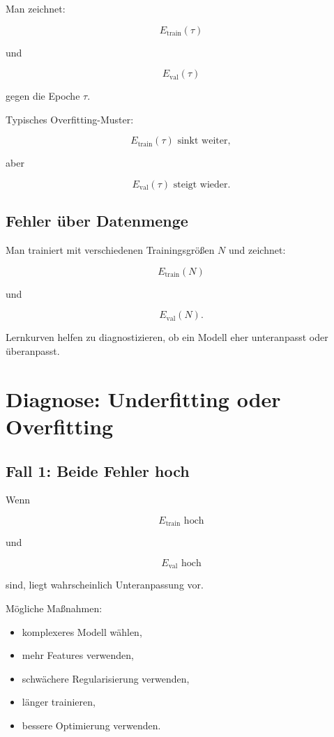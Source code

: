 Man zeichnet:

\[
    E_{\mathrm{train}}(\tau)
\]

und

\[
    E_{\mathrm{val}}(\tau)
\]

gegen die Epoche \(\tau\).

Typisches Overfitting-Muster:

\[
    E_{\mathrm{train}}(\tau)
    \text{ sinkt weiter},
\]

aber

\[
    E_{\mathrm{val}}(\tau)
    \text{ steigt wieder}.
\]

\subsection{Fehler über Datenmenge}

Man trainiert mit verschiedenen Trainingsgrößen \(N\) und zeichnet:

\[
    E_{\mathrm{train}}(N)
\]

und

\[
    E_{\mathrm{val}}(N).
\]

\begin{conceptbox}
Lernkurven helfen zu diagnostizieren, ob ein Modell eher unteranpasst oder überanpasst.
\end{conceptbox}

\section{Diagnose: Underfitting oder Overfitting}

\subsection{Fall 1: Beide Fehler hoch}

Wenn

\[
    E_{\mathrm{train}}
    \text{ hoch}
\]

und

\[
    E_{\mathrm{val}}
    \text{ hoch}
\]

sind, liegt wahrscheinlich Unteranpassung vor.

Mögliche Maßnahmen:

\begin{itemize}
    \item komplexeres Modell wählen,
    \item mehr Features verwenden,
    \item schwächere Regularisierung verwenden,
    \item länger trainieren,
    \item bessere Optimierung verwenden.
\end{itemize}


